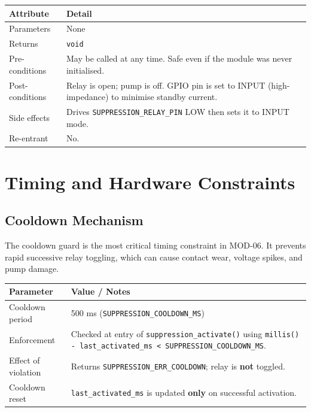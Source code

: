 \documentclass[12pt]{article}
\begin{document}
\begin{table}[H]
\centering\small
\begin{tabularx}{\textwidth}{L{3.5cm} X}
\toprule
\textbf{Attribute} & \textbf{Detail} \\
\midrule
Parameters & None \\
Returns & \texttt{void} \\
Pre-conditions & May be called at any time. Safe even if the module was never initialised. \\
Post-conditions & Relay is open; pump is off. GPIO pin is set to INPUT (high-impedance) to minimise standby current. \\
Side effects & Drives \texttt{SUPPRESSION\_RELAY\_PIN} LOW then sets it to INPUT mode. \\
Re-entrant & No. \\
\bottomrule
\end{tabularx}
\end{table}

\section{Timing and Hardware Constraints}

\subsection{Cooldown Mechanism}

The cooldown guard is the most critical timing constraint in MOD-06. It prevents rapid successive relay toggling, which can cause contact wear, voltage spikes, and pump damage.

\begin{table}[H]
\centering\small
\begin{tabularx}{\textwidth}{L{5cm} X}
\toprule
\textbf{Parameter} & \textbf{Value / Notes} \\
\midrule
Cooldown period & 500 ms (\texttt{SUPPRESSION\_COOLDOWN\_MS}) \\
Enforcement & Checked at entry of \texttt{suppression\_activate()} using \texttt{millis() - last\_activated\_ms < SUPPRESSION\_COOLDOWN\_MS}. \\
Effect of violation & Returns \texttt{SUPPRESSION\_ERR\_COOLDOWN}; relay is \textbf{not} toggled. \\
Cooldown reset & \texttt{last\_activated\_ms} is updated \textbf{only} on successful activation. \\
\bottomrule
\end{tabularx}
\end{table}
\end{document}
